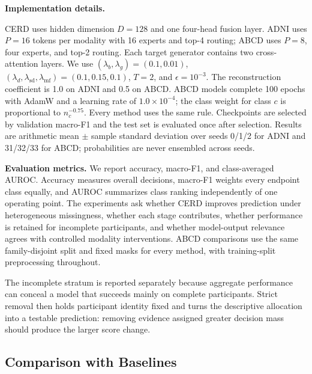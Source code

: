 \documentclass[a4paper,fleqn]{cas-dc}
\begin{document}
\noindent\textbf{Implementation details.}

\label{sec:implementation}

CERD uses hidden dimension \(D=128\) and one four-head fusion layer. ADNI uses \(P=16\) tokens per modality with 16 experts and top-4 routing; ABCD uses \(P=8\), four experts, and top-2 routing. Each target generator contains two cross-attention layers. We use \((\lambda_b,\lambda_g)=(0.1,0.01)\), \((\lambda_d,\lambda_{\mathrm{sd}},\lambda_{\mathrm{mf}})=(0.1,0.15,0.1)\), \(T=2\), and \(\epsilon=10^{-3}\). The reconstruction coefficient is 1.0 on ADNI and 0.5 on ABCD. ABCD models complete 100 epochs with AdamW and a learning rate of \(1.0\!\times\!10^{-4}\); the class weight for class \(c\) is proportional to \(n_c^{-0.75}\). Every method uses the same rule. Checkpoints are selected by validation macro-F1 and the test set is evaluated once after selection. Results are arithmetic mean \(\pm\) sample standard deviation over seeds 0/1/2 for ADNI and 31/32/33 for ABCD; probabilities are never ensembled across seeds.

\label{sec:evaluation}

\noindent\textbf{Evaluation metrics.}
We report accuracy, macro-F1, and class-averaged AUROC. Accuracy measures overall decisions, macro-F1 weights every endpoint class equally, and AUROC summarizes class ranking independently of one operating point. The experiments ask whether CERD improves prediction under heterogeneous missingness, whether each stage contributes, whether performance is retained for incomplete participants, and whether model-output relevance agrees with controlled modality interventions. ABCD comparisons use the same family-disjoint split and fixed masks for every method, with training-split preprocessing throughout.

The incomplete stratum is reported separately because aggregate performance can conceal a model that succeeds mainly on complete participants. Strict removal then holds participant identity fixed and turns the descriptive allocation into a testable prediction: removing evidence assigned greater decision mass should produce the larger score change.

\subsection{Comparison with Baselines}
\label{sec:main_results}
\label{sec:protocol}
\end{document}
